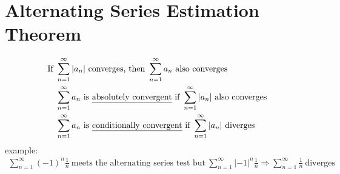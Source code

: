 \documentclass[a4paper]{article}
\begin{document}
\section{Alternating Series Estimation Theorem}
	\begin{align*}
	\text{If}\ &\sum\limits_{n=1}^{\infty}{\left|a_{n}\right|}\ \text{converges, then}\ \sum\limits_{n=1}^{\infty}{a_n}\ \text{also converges}\\
	&\sum\limits_{n=1}^{\infty}{a_n}\ \text{is \underline{absolutely convergent} if}\ \sum\limits_{n=1}^{\infty}{\left|a_{n}\right|}\ \text{also converges}\\
	&\sum\limits_{n=1}^{\infty}{a_n}\ \text{is \underline{conditionally convergent} if}\ \sum\limits_{n=1}^{\infty}{\left|a_{n}\right|}\ \text{diverges}
	\end{align*}
	example:\\
	{\setlength{\abovedisplayskip}{0pt}
		\begin{align*}
		 \sum\limits_{n=1}^{\infty}{\left(-1\right)^{n}\frac{1}{n}}\ \text{meets the alternating series test but}\ \sum\limits_{n=1}^{\infty}{\left|-1\right|^{n}\frac{1}{n}}\Rightarrow\sum\limits_{n=1}^{\infty}{\frac{1}{n}}\ \text{diverges}
		\end{align*}
		}

\pagebreak
\end{document}
